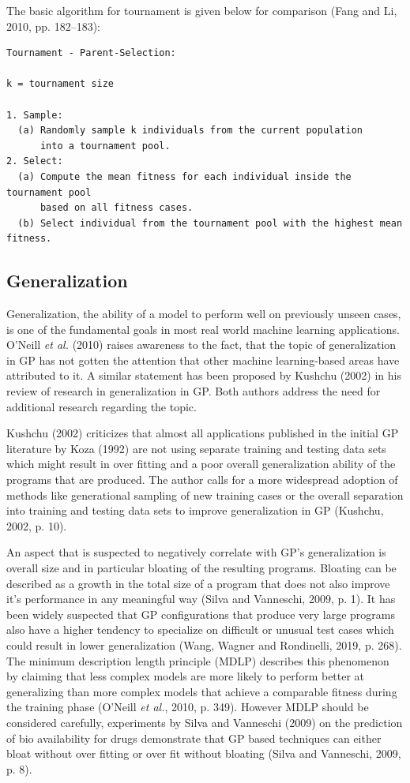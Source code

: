 \documentclass[
  12pt,
]{article}
\begin{document}
The basic algorithm for tournament is given below for comparison (Fang
and Li, 2010, pp. 182--183):

\begin{verbatim}
Tournament - Parent-Selection:

k = tournament size

1. Sample:
  (a) Randomly sample k individuals from the current population
      into a tournament pool.
2. Select:
  (a) Compute the mean fitness for each individual inside the tournament pool
      based on all fitness cases.
  (b) Select individual from the tournament pool with the highest mean fitness.
\end{verbatim}

\hypertarget{generalization}{%
\subsection{Generalization}\label{generalization}}

Generalization, the ability of a model to perform well on previously
unseen cases, is one of the fundamental goals in most real world machine
learning applications. O'Neill \emph{et al.} (2010) raises awareness to
the fact, that the topic of generalization in GP has not gotten the
attention that other machine learning-based areas have attributed to it.
A similar statement has been proposed by Kushchu (2002) in his review of
research in generalization in GP. Both authors address the need for
additional research regarding the topic.

Kushchu (2002) criticizes that almost all applications published in the
initial GP literature by Koza (1992) are not using separate training and
testing data sets which might result in over fitting and a poor overall
generalization ability of the programs that are produced. The author
calls for a more widespread adoption of methods like generational
sampling of new training cases or the overall separation into training
and testing data sets to improve generalization in GP (Kushchu, 2002, p.
10).

An aspect that is suspected to negatively correlate with GP's
generalization is overall size and in particular bloating of the
resulting programs. Bloating can be described as a growth in the total
size of a program that does not also improve it's performance in any
meaningful way (Silva and Vanneschi, 2009, p. 1). It has been widely
suspected that GP configurations that produce very large programs also
have a higher tendency to specialize on difficult or unusual test cases
which could result in lower generalization (Wang, Wagner and Rondinelli,
2019, p. 268). The minimum description length principle (MDLP) describes
this phenomenon by claiming that less complex models are more likely to
perform better at generalizing than more complex models that achieve a
comparable fitness during the training phase (O'Neill \emph{et al.},
2010, p. 349). However MDLP should be considered carefully, experiments
by Silva and Vanneschi (2009) on the prediction of bio availability for
drugs demonstrate that GP based techniques can either bloat without over
fitting or over fit without bloating (Silva and Vanneschi, 2009, p. 8).
\end{document}
